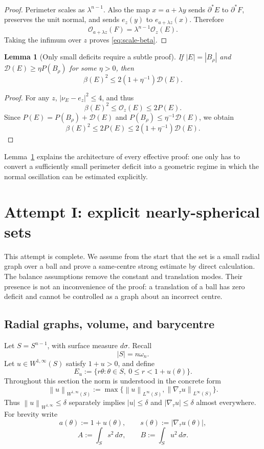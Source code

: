 \documentclass[11pt]{amsart}
\newtheorem{lemma}[theorem]{Lemma}
\theoremstyle{definition}
\newcommand{\Per}{P}
\newcommand{\norm}[1]{\left\|#1\right\|}
\newcommand{\osc}{\mathcal O}
\newcommand{\Def}{\mathcal D}
\begin{document}
\begin{proof}
Perimeter scales as \(\lambda^{n-1}\).  Also the map
\(x=a+\lambda y\) sends \(\partial^*E\) to \(\partial^*F\), preserves the
unit normal, and sends \(e_z(y)\) to \(e_{a+\lambda z}(x)\).  Therefore
\[
   \osc_{a+\lambda z}(F)=\lambda^{n-1}\osc_z(E).
\]
Taking the infimum over \(z\) proves \eqref{eq:scale-beta}.
\end{proof}

\begin{lemma}[Only small deficits require a subtle proof]\label{lem:large}
If \(|E|=|B_\rho|\) and
\(\Def(E)\ge\eta\Per(B_\rho)\) for some \(\eta>0\), then
\[
   \beta(E)^2\le 2(1+\eta^{-1})\Def(E).
\tag{2.7}\label{eq:large-branch}
\]
\end{lemma}

\begin{proof}
For any \(z\), \(|\nu_E-e_z|^2\le4\), and thus
\[
   \beta(E)^2\le\osc_z(E)\le2\Per(E).
\]
Since \(\Per(E)=\Per(B_\rho)+\Def(E)\) and
\(\Per(B_\rho)\le\eta^{-1}\Def(E)\), we obtain
\[
   \beta(E)^2\le2\Per(E)
   \le2(1+\eta^{-1})\Def(E).
\]
\end{proof}

Lemma~\ref{lem:large} explains the architecture of every effective proof:
one only has to convert a sufficiently small perimeter deficit into a
geometric regime in which the normal oscillation can be estimated explicitly.

\section{Attempt I: explicit nearly-spherical sets}\label{sec:graphs}

This attempt is complete.  We assume from the start that the set is a small
radial graph over a ball and prove a same-centre strong estimate by direct
calculation.  The balance assumptions remove the constant and translation
modes.  Their presence is not an inconvenience of the proof: a translation
of a ball has zero deficit and cannot be controlled as a graph about an
incorrect centre.

\subsection{Radial graphs, volume, and barycentre}

Let \(S=S^{n-1}\), with surface measure \(d\sigma\).  Recall
\[
   |S|=n\omega_n.
\tag{3.1}\label{eq:sphere-measure}
\]
Let \(u\in W^{1,\infty}(S)\) satisfy \(1+u>0\), and define
\[
   E_u:=\{r\theta:\theta\in S,\ 0\le r<1+u(\theta)\}.
\tag{3.2}\label{eq:radial-set}
\]
Throughout this section the norm is understood in the concrete form
\[
   \norm{u}_{W^{1,\infty}(S)}
   :=\max\{\norm{u}_{L^\infty(S)},
           \norm{\nabla_\tau u}_{L^\infty(S)}\}.
\]
Thus \(\norm{u}_{W^{1,\infty}}\le\delta\) separately implies
\(|u|\le\delta\) and \(|\nabla_\tau u|\le\delta\) almost everywhere.
For brevity write
\[
   a(\theta):=1+u(\theta),\qquad
   s(\theta):=|\nabla_\tau u(\theta)|,
\]
\[
   A:=\int_Ss^2\,d\sigma,\qquad
   B:=\int_Su^2\,d\sigma.
\tag{3.3}\label{eq:AB}
\]
\end{document}
